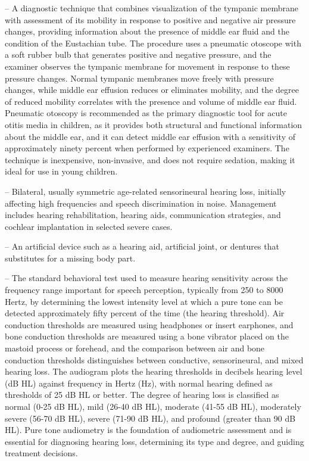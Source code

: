 -- A diagnostic technique that combines visualization of the tympanic membrane with assessment of its mobility in response to positive and negative air pressure changes, providing information about the presence of middle ear fluid and the condition of the Eustachian tube. The procedure uses a pneumatic otoscope with a soft rubber bulb that generates positive and negative pressure, and the examiner observes the tympanic membrane for movement in response to these pressure changes. Normal tympanic membranes move freely with pressure changes, while middle ear effusion reduces or eliminates mobility, and the degree of reduced mobility correlates with the presence and volume of middle ear fluid. Pneumatic otoscopy is recommended as the primary diagnostic tool for acute otitis media in children, as it provides both structural and functional information about the middle ear, and it can detect middle ear effusion with a sensitivity of approximately ninety percent when performed by experienced examiners. The technique is inexpensive, non-invasive, and does not require sedation, making it ideal for use in young children.

-- Bilateral, usually symmetric age-related sensorineural hearing loss, initially affecting high frequencies and speech discrimination in noise. Management includes hearing rehabilitation, hearing aids, communication strategies, and cochlear implantation in selected severe cases.

-- An artificial device such as a hearing aid, artificial joint, or dentures that substitutes for a missing body part.

-- The standard behavioral test used to measure hearing sensitivity across the frequency range important for speech perception, typically from 250 to 8000 Hertz, by determining the lowest intensity level at which a pure tone can be detected approximately fifty percent of the time (the hearing threshold). Air conduction thresholds are measured using headphones or insert earphones, and bone conduction thresholds are measured using a bone vibrator placed on the mastoid process or forehead, and the comparison between air and bone conduction thresholds distinguishes between conductive, sensorineural, and mixed hearing loss. The audiogram plots the hearing thresholds in decibels hearing level (dB HL) against frequency in Hertz (Hz), with normal hearing defined as thresholds of 25 dB HL or better. The degree of hearing loss is classified as normal (0-25 dB HL), mild (26-40 dB HL), moderate (41-55 dB HL), moderately severe (56-70 dB HL), severe (71-90 dB HL), and profound (greater than 90 dB HL). Pure tone audiometry is the foundation of audiometric assessment and is essential for diagnosing hearing loss, determining its type and degree, and guiding treatment decisions.

